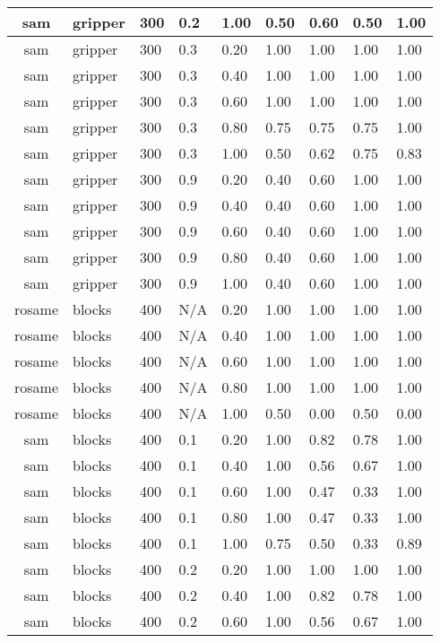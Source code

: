 \begin{table}[ht]
\begin{tabular}{c}
sam & gripper & 300 & 0.2 & 1.00 & 0.50 & 0.60 & 0.50 & 1.00 \\ \hline
sam & gripper & 300 & 0.3 & 0.20 & 1.00 & 1.00 & 1.00 & 1.00 \\ \hline
sam & gripper & 300 & 0.3 & 0.40 & 1.00 & 1.00 & 1.00 & 1.00 \\ \hline
sam & gripper & 300 & 0.3 & 0.60 & 1.00 & 1.00 & 1.00 & 1.00 \\ \hline
sam & gripper & 300 & 0.3 & 0.80 & 0.75 & 0.75 & 0.75 & 1.00 \\ \hline
sam & gripper & 300 & 0.3 & 1.00 & 0.50 & 0.62 & 0.75 & 0.83 \\ \hline
sam & gripper & 300 & 0.9 & 0.20 & 0.40 & 0.60 & 1.00 & 1.00 \\ \hline
sam & gripper & 300 & 0.9 & 0.40 & 0.40 & 0.60 & 1.00 & 1.00 \\ \hline
sam & gripper & 300 & 0.9 & 0.60 & 0.40 & 0.60 & 1.00 & 1.00 \\ \hline
sam & gripper & 300 & 0.9 & 0.80 & 0.40 & 0.60 & 1.00 & 1.00 \\ \hline
sam & gripper & 300 & 0.9 & 1.00 & 0.40 & 0.60 & 1.00 & 1.00 \\ \hline
rosame & blocks & 400 & N/A & 0.20 & 1.00 & 1.00 & 1.00 & 1.00 \\ \hline
rosame & blocks & 400 & N/A & 0.40 & 1.00 & 1.00 & 1.00 & 1.00 \\ \hline
rosame & blocks & 400 & N/A & 0.60 & 1.00 & 1.00 & 1.00 & 1.00 \\ \hline
rosame & blocks & 400 & N/A & 0.80 & 1.00 & 1.00 & 1.00 & 1.00 \\ \hline
rosame & blocks & 400 & N/A & 1.00 & 0.50 & 0.00 & 0.50 & 0.00 \\ \hline
sam & blocks & 400 & 0.1 & 0.20 & 1.00 & 0.82 & 0.78 & 1.00 \\ \hline
sam & blocks & 400 & 0.1 & 0.40 & 1.00 & 0.56 & 0.67 & 1.00 \\ \hline
sam & blocks & 400 & 0.1 & 0.60 & 1.00 & 0.47 & 0.33 & 1.00 \\ \hline
sam & blocks & 400 & 0.1 & 0.80 & 1.00 & 0.47 & 0.33 & 1.00 \\ \hline
sam & blocks & 400 & 0.1 & 1.00 & 0.75 & 0.50 & 0.33 & 0.89 \\ \hline
sam & blocks & 400 & 0.2 & 0.20 & 1.00 & 1.00 & 1.00 & 1.00 \\ \hline
sam & blocks & 400 & 0.2 & 0.40 & 1.00 & 0.82 & 0.78 & 1.00 \\ \hline
sam & blocks & 400 & 0.2 & 0.60 & 1.00 & 0.56 & 0.67 & 1.00 \\ \hline

\end{tabular}
\end{table}
